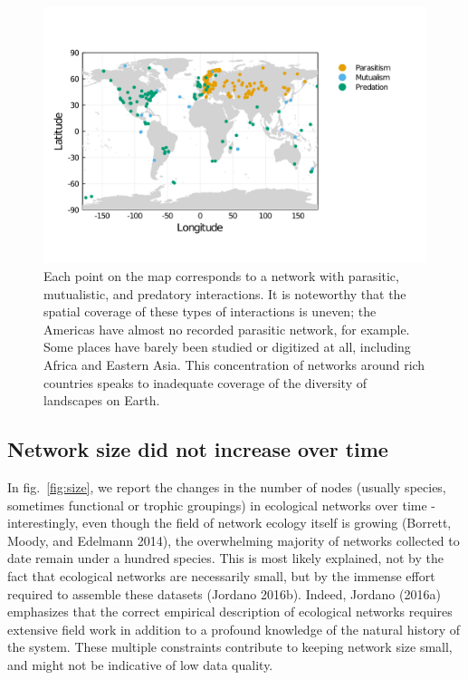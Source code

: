 \documentclass[11pt]{article}
\makeatletter
\def\maxwidth{\ifdim\Gin@nat@width>\linewidth\linewidth
\else\Gin@nat@width\fi}
\let\Oldincludegraphics\includegraphics
\renewcommand{\includegraphics}[1]{\Oldincludegraphics[width=\maxwidth]{#1}}
\makeatother
\begin{document}
\begin{figure}
\hypertarget{fig:spatial}{%
\centering
\includegraphics{figures/map_networks_type.png}
\caption{Each point on the map corresponds to a network with parasitic,
mutualistic, and predatory interactions. It is noteworthy that the
spatial coverage of these types of interactions is uneven; the Americas
have almost no recorded parasitic network, for example. Some places have
barely been studied or digitized at all, including Africa and Eastern
Asia. This concentration of networks around rich countries speaks to
inadequate coverage of the diversity of landscapes on
Earth.}\label{fig:spatial}
}
\end{figure}

\hypertarget{network-size-did-not-increase-over-time}{%
\subsection{Network size did not increase over
time}\label{network-size-did-not-increase-over-time}}

In fig.~\ref{fig:size}, we report the changes in the number of nodes
(usually species, sometimes functional or trophic groupings) in
ecological networks over time - interestingly, even though the field of
network ecology itself is growing (Borrett, Moody, and Edelmann 2014),
the overwhelming majority of networks collected to date remain under a
hundred species. This is most likely explained, not by the fact that
ecological networks are necessarily small, but by the immense effort
required to assemble these datasets (Jordano 2016b). Indeed, Jordano
(2016a) emphasizes that the correct empirical description of ecological
networks requires extensive field work in addition to a profound
knowledge of the natural history of the system. These multiple
constraints contribute to keeping network size small, and might not be
indicative of low data quality.
\end{document}

